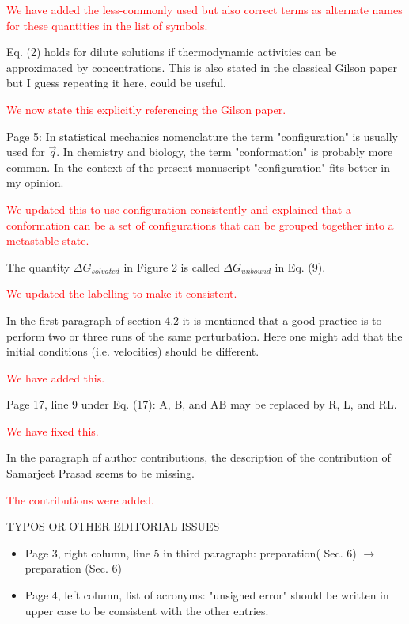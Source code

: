 \documentclass[11pt,a4paper]{letter} %
\begin{document}
\begin{letter}
\textcolor{red}{We have added the less-commonly used but also correct terms as alternate names for these quantities in the list of symbols.}

Eq. (2) holds for dilute solutions if thermodynamic activities can be approximated by concentrations. This is also stated in the classical Gilson paper but I guess repeating it here, could be useful.

\textcolor{red}{We now state this explicitly referencing the Gilson paper.}

Page 5: In statistical mechanics nomenclature the term "configuration" is usually used for $\vec{q}$. In chemistry and biology, the term "conformation" is probably more common. In the context of the present manuscript "configuration" fits better in my opinion.

\textcolor{red}{We updated this to use configuration consistently and explained that a conformation can be a set of configurations that can be grouped together into a metastable state.}

The quantity $\Delta G_{solvated}$ in Figure 2 is called $\Delta G_{unbound}$ in Eq. (9).

\textcolor{red}{We updated the labelling to make it consistent. }

In the first paragraph of section 4.2 it is mentioned that a good practice is to perform two or three runs of the same perturbation. Here one might add that the initial conditions (i.e. velocities) should be different.

\textcolor{red} {We have added this.}

Page 17, line 9 under Eq. (17): A, B, and AB may be replaced by R, L, and RL.

\textcolor{red} {We have fixed this.}

In the paragraph of author contributions, the description of the contribution of Samarjeet Prasad seems to be missing.

\textcolor{red} {The contributions were added.}

TYPOS OR OTHER EDITORIAL ISSUES
\begin{itemize}
  

   \item Page 3, right column, line 5 in third paragraph: preparation( Sec. 6) $\rightarrow$ preparation (Sec. 6)    
   \item Page 4, left column, list of acronyms: "unsigned error" should be written in upper case to be consistent with the other entries.


\end{itemize}
\end{letter}
\end{document}
